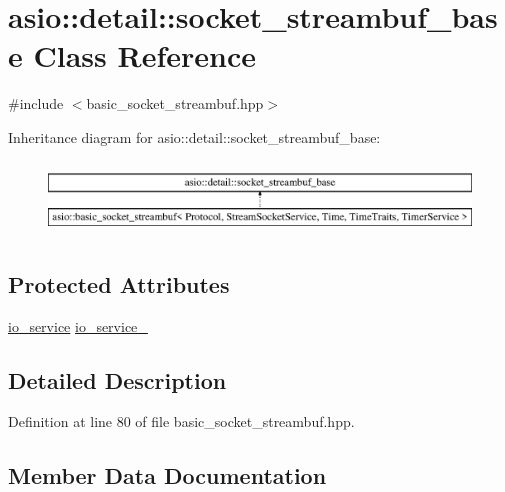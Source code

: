 \hypertarget{classasio_1_1detail_1_1socket__streambuf__base}{}\section{asio\+:\+:detail\+:\+:socket\+\_\+streambuf\+\_\+base Class Reference}
\label{classasio_1_1detail_1_1socket__streambuf__base}


{\ttfamily \#include $<$basic\+\_\+socket\+\_\+streambuf.\+hpp$>$}

Inheritance diagram for asio\+:\+:detail\+:\+:socket\+\_\+streambuf\+\_\+base\+:\begin{figure}[H]
\begin{center}
\leavevmode
\includegraphics[height=1.964912cm]{classasio_1_1detail_1_1socket__streambuf__base}
\end{center}
\end{figure}
\subsection*{Protected Attributes}
\begin{DoxyCompactItemize}
\item 
\hyperlink{classasio_1_1io__service}{io\+\_\+service} \hyperlink{classasio_1_1detail_1_1socket__streambuf__base_a8743e8a5e39a4d1cc57459ee59306a19}{io\+\_\+service\+\_\+}
\end{DoxyCompactItemize}


\subsection{Detailed Description}


Definition at line 80 of file basic\+\_\+socket\+\_\+streambuf.\+hpp.



\subsection{Member Data Documentation}
\hypertarget{classasio_1_1detail_1_1socket__streambuf__base_a8743e8a5e39a4d1cc57459ee59306a19}{}
